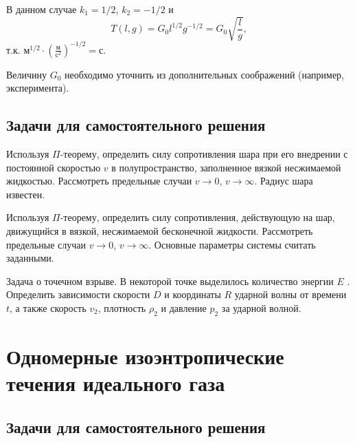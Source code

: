 \documentclass[a4paper, 14pt]{extarticle}
\begin{document}
В данном случае $k_1 = 1/2$, $k_2 = -1/2$ и 
\[
T(l,g) = G_0 l^{1/2} g^{-1/2}= G_0  \sqrt{\frac{l}{g}},
\]
т.к. $\text{м}^{1/2} \cdot \left(\displaystyle\frac{\text{м}}{\text{с}^2}\right)^{-1/2} = \text{с}$.

Величину $G_0$ необходимо уточнить из дополнительных соображений (например, эксперимента).

\subsection{Задачи для самостоятельного решения}

\begin{problems}
	
	\item Используя $\Pi$-теорему, определить силу сопротивления шара при его внедрении с постоянной скоростью $v$ в полупространство, заполненное вязкой несжимаемой жидкостью. Рассмотреть предельные случаи $v \to 0$, $v \to \infty$. Радиус шара известен.
	
	\item
	Используя  $\Pi$-теорему, определить силу сопротивления, действующую на шар, движущийся в вязкой, несжимаемой бесконечной жидкости. Рассмотреть предельные случаи $v \to 0$, $v \to \infty$. Основные параметры системы считать заданными.
	
	\item
	Задача о точечном взрыве. В некоторой точке выделилось количество энергии $E$ . Определить зависимости скорости $D$ и координаты $R$ ударной волны от времени $t$, а также скорость $v_2$, плотность $\rho_2$ и давление $p_2$ за ударной волной. 

\end{problems}

\section{Одномерные изоэнтропические течения идеального газа }

\subsection{Задачи для самостоятельного решения}
\end{document}
